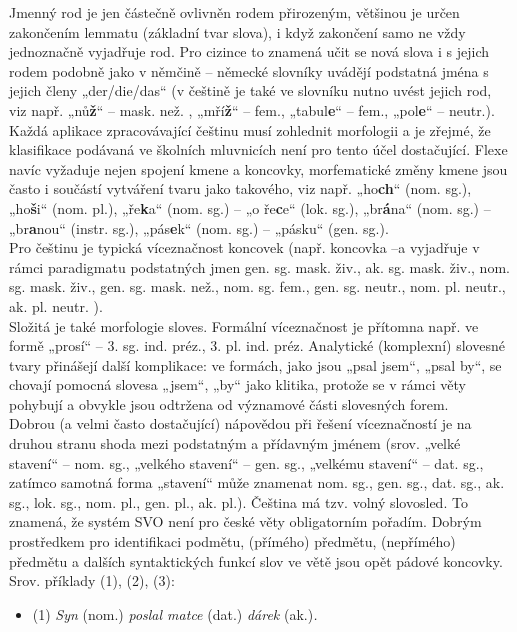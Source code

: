 \begin{multicols}{2}
Jmenný rod je jen částečně ovlivněn rodem přirozeným, většinou je určen zakončením lemmatu (základní tvar slova), i když zakončení samo ne vždy jednoznačně vyjadřuje rod. Pro cizince to znamená učit se nová slova i s jejich rodem podobně jako v němčině – německé slovníky uvádějí podstatná jména s jejich členy „der/die/das“ (v češtině je také ve slovníku nutno uvést jejich rod, viz např. „nů\textbf{ž}“ – mask. než. , „mří\textbf{ž}“ – fem., „tabul\textbf{e}“ – fem., „pol\textbf{e}“ – neutr.).\\
Každá aplikace zpracovávající češtinu musí zohlednit morfologii a je zřejmé, že klasifikace podávaná ve školních mluvnicích není pro tento účel dostačující. Flexe navíc vyžaduje nejen spojení kmene a koncovky, morfematické změny kmene jsou často i součástí vytváření tvaru jako takového, viz např. „ho\textbf{ch}“ (nom. sg.), „ho\textbf{š}i“ (nom. pl.), „ře\textbf{k}a“ (nom. sg.) – „o ře\textbf{c}e“ (lok. sg.), „br\textbf{á}na“ (nom. sg.) – „br\textbf{a}nou“ (instr. sg.), „pás\textbf{e}k“ (nom. sg.) – „pásku“ (gen. sg.).\\
Pro češtinu je typická víceznačnost koncovek (např. koncovka –a vyjadřuje v rámci paradigmatu podstatných jmen gen. sg. mask. živ., ak. sg. mask. živ., nom. sg. mask. živ., gen. sg. mask. než., nom. sg. fem., gen. sg. neutr., nom. pl. neutr., ak. pl. neutr. ).\\
Složitá je také morfologie sloves. Formální víceznačnost je přítomna např. ve formě „prosí“ – 3. sg. ind. préz., 3. pl. ind. préz. Analytické (komplexní) slovesné tvary přinášejí další komplikace: ve formách, jako jsou „psal jsem“, „psal by“, se chovají pomocná slovesa „jsem“, „by“ jako klitika, protože se  v rámci věty pohybují a obvykle jsou odtržena od významové části slovesných forem.\\
Dobrou (a velmi často dostačující) nápovědou při řešení víceznačností je na druhou stranu shoda mezi podstatným a přídavným jménem (srov. „velké stavení“ – nom. sg., „velkého stavení“ – gen. sg., „velkému stavení“ – dat. sg., zatímco samotná forma „stavení“ může znamenat nom. sg., gen. sg., dat. sg., ak. sg., lok. sg., nom. pl., gen. pl., ak. pl.).
Čeština má tzv. volný slovosled. To znamená, že systém SVO není pro české věty obligatorním pořadím. Dobrým prostředkem pro identifikaci podmětu, (přímého) předmětu, (nepřímého) předmětu a dalších syntaktických funkcí slov ve větě jsou opět pádové koncovky. Srov. příklady (1), (2), (3):
\begin{itemize}
\item[] (1)	\textit{Syn} (nom.) \textit{poslal matce} (dat.) \textit{dárek} (ak.)\textit{.}

\end{itemize}
\end{multicols}
